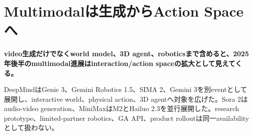 \section{Multimodalは生成からAction Spaceへ}
\label{pkg:multi}
\noindent\textbf{video生成だけでなくworld model、3D agent、roboticsまで含めると、2025年後半のmultimodal進展はinteraction/action spaceの拡大として見えてくる。}\autocite{src-dd5d9b8662f3}

DeepMindはGenie 3、Gemini Robotics 1.5、SIMA 2、Gemini 3を別eventとして展開し、interactive world、physical action、3D agentへ対象を広げた。Sora 2はaudio-video generation、MiniMaxはM2とHailuo 2.3を並行展開した。research prototype、limited-partner robotics、GA API、product rolloutは同一availabilityとして扱わない。\autocite{src-661a3476d3d5,src-8530f5b0e216,src-d8e13386974c,src-dd5d9b8662f3}
